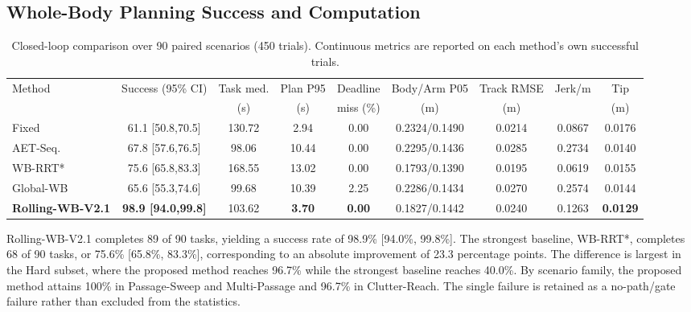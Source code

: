\documentclass[journal,twoside]{IEEEtran}
\begin{document}
\subsection{Whole-Body Planning Success and Computation}
\begin{table}[t]
\centering
\caption{Closed-loop comparison over 90 paired scenarios (450 trials). Continuous metrics are reported on each method's own successful trials.}
\label{tab:main_results}
\setlength{\tabcolsep}{3.0pt}
\begin{tabular}{lcccccccc}
\toprule
Method & Success (95\% CI) & Task med. & Plan P95 & Deadline & Body/Arm P05 & Track RMSE & Jerk/m & Tip \\
 &  & (s) & (s) & miss (\%) & (m) & (m) &  & (m) \\
\midrule
Fixed & 61.1 [50.8,70.5] & 130.72 & 2.94 & 0.00 & 0.2324/0.1490 & 0.0214 & 0.0867 & 0.0176 \\
AET-Seq. & 67.8 [57.6,76.5] & 98.06 & 10.44 & 0.00 & 0.2295/0.1436 & 0.0285 & 0.2734 & 0.0140 \\
WB-RRT* & 75.6 [65.8,83.3] & 168.55 & 13.02 & 0.00 & 0.1793/0.1390 & 0.0195 & 0.0619 & 0.0155 \\
Global-WB & 65.6 [55.3,74.6] & 99.68 & 10.39 & 2.25 & 0.2286/0.1434 & 0.0270 & 0.2574 & 0.0144 \\
\textbf{Rolling-WB-V2.1} & \textbf{98.9 [94.0,99.8]} & 103.62 & \textbf{3.70} & \textbf{0.00} & 0.1827/0.1442 & 0.0240 & 0.1263 & \textbf{0.0129} \\
\bottomrule
\end{tabular}
\end{table}

Rolling-WB-V2.1 completes 89 of 90 tasks, yielding a success rate of 98.9\% [94.0\%, 99.8\%]. The strongest baseline, WB-RRT*, completes 68 of 90 tasks, or 75.6\% [65.8\%, 83.3\%], corresponding to an absolute improvement of 23.3 percentage points. The difference is largest in the Hard subset, where the proposed method reaches 96.7\% while the strongest baseline reaches 40.0\%. By scenario family, the proposed method attains 100\% in Passage-Sweep and Multi-Passage and 96.7\% in Clutter-Reach. The single failure is retained as a no-path/gate failure rather than excluded from the statistics.
\end{document}
